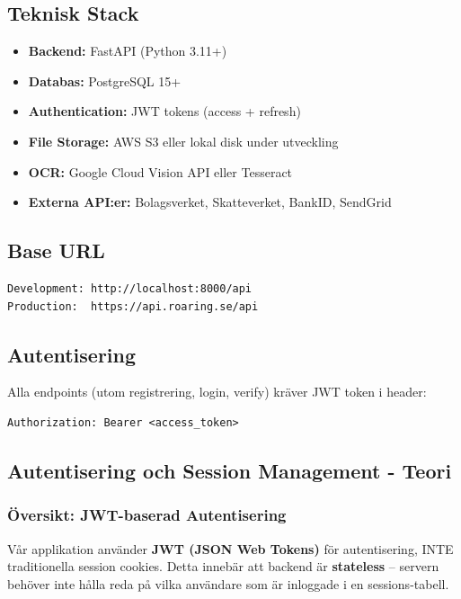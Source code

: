 \documentclass[12pt,a4paper]{article}
\begin{document}
\subsection{Teknisk Stack}
\begin{itemize}[noitemsep]
  \item \textbf{Backend:} FastAPI (Python 3.11+)
  \item \textbf{Databas:} PostgreSQL 15+
  \item \textbf{Authentication:} JWT tokens (access + refresh)
  \item \textbf{File Storage:} AWS S3 eller lokal disk under utveckling
  \item \textbf{OCR:} Google Cloud Vision API eller Tesseract
  \item \textbf{Externa API:er:} Bolagsverket, Skatteverket, BankID, SendGrid
\end{itemize}

\subsection{Base URL}
\begin{verbatim}
Development: http://localhost:8000/api
Production:  https://api.roaring.se/api
\end{verbatim}

\subsection{Autentisering}
Alla endpoints (utom registrering, login, verify) kräver JWT token i header:
\begin{verbatim}
Authorization: Bearer <access_token>
\end{verbatim}

\subsection{Autentisering och Session Management - Teori}

\subsubsection{Översikt: JWT-baserad Autentisering}

Vår applikation använder \textbf{JWT (JSON Web Tokens)} för autentisering, INTE traditionella session cookies.
Detta innebär att backend är \textbf{stateless} -- servern behöver inte hålla reda på vilka 
användare som är inloggade i en sessions-tabell.
\end{document}
